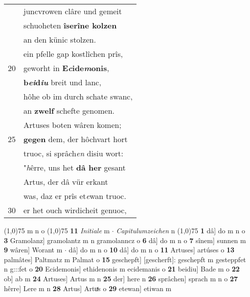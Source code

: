 \documentclass[8pt,a4paper,notitlepage]{article}
\begin{document}
\begin{table}[ht]
\begin{minipage}[t]{0.5\linewidth}
\begin{tabular}{rl}
 & juncvrowen clâre und gemeit\\ 
 & schuoheten \textbf{îserîne kolzen}\\ 
 & an den künic stolzen.\\ 
 & ein pfelle gap kostlîchen prîs,\\ 
20 & geworht in \textbf{E\textit{c}ide\textit{m}onis},\\ 
 & \textbf{b\textit{ei}d\textit{iu}} breit und lanc,\\ 
 & hôhe ob im durch schate swanc,\\ 
 & an \textbf{zwelf} schefte genomen.\\ 
 & Artuses boten wâren komen;\\ 
25 & \textbf{gegen} dem, der hôchvart hort\\ 
 & truoc, si sprâch\textit{en} disiu wort:\\ 
 & "\textit{h}êrre, uns het \textbf{dâ her} gesant\\ 
 & Artus, der dâ vür erkant\\ 
 & was, daz er prîs et\textit{e}wan truoc.\\ 
30 & er het ouch wirdicheit genuoc,\\ 
\end{tabular}
\scriptsize
\line(1,0){75} \newline
m n o \newline
\line(1,0){75} \newline
\textbf{11} \textit{Initiale} m   $\cdot$ \textit{Capitulumzeichen} n  \newline
\line(1,0){75} \newline
\textbf{1} dâ] do m n o \textbf{3} Gramolanz] gramolantz m n gramolanncz o \textbf{6} dâ] do m n o \textbf{7} sînem] sunnen m \textbf{9} wâren] Worant m  $\cdot$ dâ] do m n o \textbf{10} dâ] do m n o \textbf{11} Artuses] artúses o \textbf{13} palmâtes] Paltmatz m Palmat o \textbf{15} geschepft] [gescherft]: geschepft m gesteppfet n g:::fet o \textbf{20} Ecidemonis] ethidenonis m ecidemanis o \textbf{21} beidiu] Bade m o \textbf{22} ob] ab m \textbf{24} Artuses] Artus m n \textbf{25} der] here n \textbf{26} sprâchen] sprach m n o \textbf{27} hêrre] Lere m n \textbf{28} Artus] Artuͯs o \textbf{29} etewan] etiwan m \newline
\end{minipage}
\end{table}
\newpage
\end{document}

